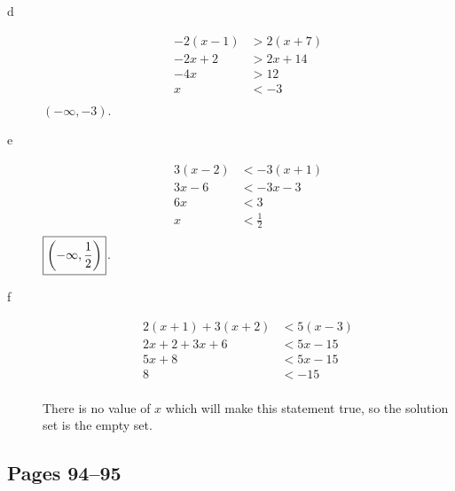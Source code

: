 \documentclass[letterpaper, landscape]{exam}
\begin{document}
\begin{description}
\begin{description}
          \item[d]
            \begin{align*}
              -2(x - 1) & > 2(x + 7) \\
              -2x + 2   & > 2x + 14\\
              -4x       & > 12\\
              x         & < -3\\
            \end{align*}
            $\boxed{ (-\infty, -3) }$.

          \item[e]
            \begin{align*}
              3(x - 2) & < -3(x + 1) \\
              3x - 6   & < -3x - 3 \\
              6x       & < 3 \\
              x        & < \frac{1}{2} \\
            \end{align*}
            $\boxed{ \del{ -\infty, \frac{1}{2} } }$.

          \item[f]
            \begin{align*}
              2(x + 1) + 3(x + 2) & < 5(x - 3) \\
              2x + 2 + 3x + 6     & < 5x - 15 \\
              5x + 8              & < 5x - 15 \\
              8                   & < -15 \\
            \end{align*}

            There is no value of $x$ which will make this statement true, so the solution set is the empty set.

        \end{description}
      \end{description}

      \subsection{Pages 94--95} 
\end{document}
